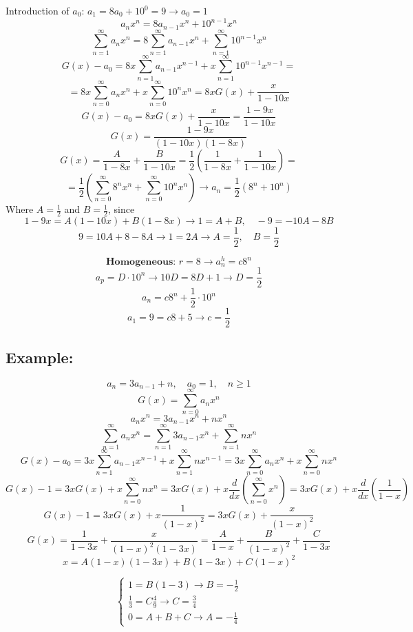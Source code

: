 \documentclass[11pt]{article}
\begin{document}
Introduction of $a_0$: $a_1 = 8a_0 + 10^0 = 9 \rightarrow a_0 = 1$
\[
a_n x^n = 8a_{n-1} x^n + 10^{n-1} x^n
\]
\[
\sum_{n = 1}^{\infty} a_n x^n = 8 \sum_{n = 1}^{\infty} a_{n-1} x^{n} + \sum_{n = 1}^{\infty} 10^{n-1} x^n 
\]
\[
G(x) - a_0 = 8x \sum_{n = 1}^{\infty} a_{n-1} x^{n - 1} + x \sum_{n = 1}^{\infty} 10^{n-1} x^ {n-1} = 
\]
\[
= 8x \sum_{n = 0}^{\infty} a_n x^n + x \sum_{n = 0}^{\infty} 10^n x^n = 8xG(x) + \frac{x}{1 - 10x}
\]
\[ 
G(x) - a_0 = 8xG(x) + \frac{x}{1 - 10x} = \frac{1 - 9x}{1 - 10x}
\]
\[
G(x) = \frac{1 - 9x}{(1 - 10x)(1 - 8x)} 
\]
\[
G(x) = \frac{A}{1 - 8x} + \frac{B}{1 - 10x} = \frac{1}{2} \left( \frac{1}{1 - 8x} + \frac{1}{1 - 10x} \right) = 
\]
\[
= \frac{1}{2} \left( \sum_{n = 0}^{\infty} 8^n x^n + \sum_{n = 0}^{\infty} 10^n x^n \right) \rightarrow a_n = \frac{1}{2} (8^n + 10^n)
\]
Where $A = \frac{1}{2}$ and $B = \frac{1}{2}$, since
\[
1 - 9x = A(1 - 10x) + B(1 - 8x) \rightarrow 1 = A + B, \quad -9 = -10A - 8B
\]
\[
9 = 10A + 8 - 8A \rightarrow 1 = 2A \rightarrow A = \frac{1}{2}, \quad B = \frac{1}{2}
\]

\[
\textbf{Homogeneous: } r = 8 \rightarrow a_n^h = c8^n
\]
\[
a_p = D \cdot 10^n \rightarrow 10D = 8D + 1 \rightarrow D = \frac{1}{2}
\]
\[
a_n = c8^n + \frac{1}{2} \cdot 10^n
\]
\[
a_1 = 9 = c8 + 5 \rightarrow c = \frac{1}{2}
\]

\subsection*{Example:}
\[
a_n = 3a_{n-1} + n, \quad a_0 = 1, \quad n \geq 1
\]
\[
G(x) = \sum_{n = 0}^{\infty} a_n x^n
\]
\[
a_n x^n = 3a_{n-1} x^n + nx^n
\]
\[
\sum_{n = 1}^{\infty} a_n x^n = \sum_{n = 1}^{\infty} 3a_{n-1} x^n + \sum_{n = 1}^{\infty} nx^n
\]
\[
G(x) - a_0 = 3x \sum_{n = 1}^{\infty} a_{n-1} x^{n-1} + x \sum_{n = 1}^{\infty} nx^{n-1} = 3x \sum_{n = 0}^{\infty} a_n x^n + x \sum_{n = 0}^{\infty} nx^n
\]
\[
G(x) - 1 = 3xG(x) + x \sum_{n = 0}^{\infty} nx^n = 3xG(x) + x \frac{d}{dx} \left( \sum_{n = 0}^{\infty} x^n \right) = 3xG(x) + x \frac{d}{dx} \left( \frac{1}{1 - x} \right)
\]
\[
G(x) - 1 = 3xG(x) + x \frac{1}{(1 - x)^2} = 3xG(x) + \frac{x}{(1 - x)^2}
\]
\[
G(x) = \frac{1}{1 - 3x} + \frac{x}{(1 - x)^2(1 - 3x)} = \frac{A}{1 - x} + \frac{B}{(1 - x)^2} + \frac{C}{1 - 3x}
\]
\[
x = A(1 - x)(1 - 3x) + B(1 - 3x) + C(1 - x)^2 
\]

\[
\begin{cases}
    1 = B(1 - 3) \rightarrow B = -\frac{1}{2} \\
    \frac{1}{3} = C \frac{4}{9} \rightarrow C = \frac{3}{4} \\
    0 = A + B + C \rightarrow A = -\frac{1}{4}
\end{cases}
\]
\end{document}
